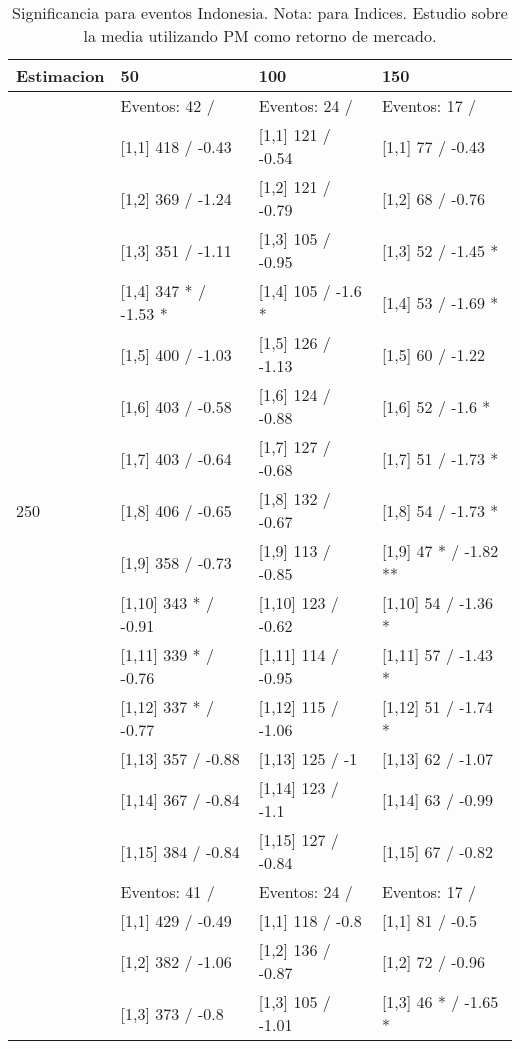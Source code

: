 \begin{table}

\caption{Significancia para eventos Indonesia. Nota: para Indices. Estudio sobre la media utilizando PM como retorno de mercado.}
\centering
\begin{tabular}[t]{llll}
\toprule
Estimacion & 50 & 100 & 150\\
\midrule
 & Eventos:  42 / & Eventos:  24 / & Eventos:  17 /\\
 & {}[1,1] 418  / -0.43 & {}[1,1] 121  / -0.54 & {}[1,1] 77  / -0.43\\
 & {}[1,2] 369  / -1.24 & {}[1,2] 121  / -0.79 & {}[1,2] 68  / -0.76\\
 & {}[1,3] 351  / -1.11 & {}[1,3] 105  / -0.95 & {}[1,3] 52  / -1.45 *\\
 & {}[1,4] 347 * / -1.53 * & {}[1,4] 105  / -1.6 * & {}[1,4] 53  / -1.69 *\\
\addlinespace
 & {}[1,5] 400  / -1.03 & {}[1,5] 126  / -1.13 & {}[1,5] 60  / -1.22\\
 & {}[1,6] 403  / -0.58 & {}[1,6] 124  / -0.88 & {}[1,6] 52  / -1.6 *\\
 & {}[1,7] 403  / -0.64 & {}[1,7] 127  / -0.68 & {}[1,7] 51  / -1.73 *\\
250 & {}[1,8] 406  / -0.65 & {}[1,8] 132  / -0.67 & {}[1,8] 54  / -1.73 *\\
 & {}[1,9] 358  / -0.73 & {}[1,9] 113  / -0.85 & {}[1,9] 47 * / -1.82 **\\
\addlinespace
 & {}[1,10] 343 * / -0.91 & {}[1,10] 123  / -0.62 & {}[1,10] 54  / -1.36 *\\
 & {}[1,11] 339 * / -0.76 & {}[1,11] 114  / -0.95 & {}[1,11] 57  / -1.43 *\\
 & {}[1,12] 337 * / -0.77 & {}[1,12] 115  / -1.06 & {}[1,12] 51  / -1.74 *\\
 & {}[1,13] 357  / -0.88 & {}[1,13] 125  / -1 & {}[1,13] 62  / -1.07\\
 & {}[1,14] 367  / -0.84 & {}[1,14] 123  / -1.1 & {}[1,14] 63  / -0.99\\
\addlinespace
 & {}[1,15] 384  / -0.84 & {}[1,15] 127  / -0.84 & {}[1,15] 67  / -0.82\\
 & Eventos:  41 / & Eventos:  24 / & Eventos:  17 /\\
 & {}[1,1] 429  / -0.49 & {}[1,1] 118  / -0.8 & {}[1,1] 81  / -0.5\\
 & {}[1,2] 382  / -1.06 & {}[1,2] 136  / -0.87 & {}[1,2] 72  / -0.96\\
 & {}[1,3] 373  / -0.8 & {}[1,3] 105  / -1.01 & {}[1,3] 46 * / -1.65 *\\

\end{tabular}
\end{table}
